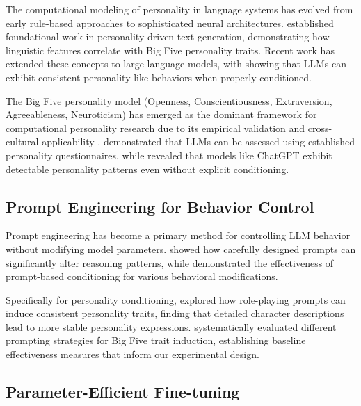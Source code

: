 The computational modeling of personality in language systems has evolved from early rule-based approaches to sophisticated neural architectures. \citet{mairesse-walker-2007-personage} established foundational work in personality-driven text generation, demonstrating how linguistic features correlate with Big Five personality traits. Recent work has extended these concepts to large language models, with \citet{jiang-etal-2023-personallm} showing that LLMs can exhibit consistent personality-like behaviors when properly conditioned.

The Big Five personality model (Openness, Conscientiousness, Extraversion, Agreeableness, Neuroticism) has emerged as the dominant framework for computational personality research due to its empirical validation and cross-cultural applicability \citep{costa-mccrae-1992-big5}. \citet{karra-etal-2022-ai-personality} demonstrated that LLMs can be assessed using established personality questionnaires, while \citet{huang-etal-2023-chatgpt-personality} revealed that models like ChatGPT exhibit detectable personality patterns even without explicit conditioning.

\subsection{Prompt Engineering for Behavior Control}

Prompt engineering has become a primary method for controlling LLM behavior without modifying model parameters. \citet{wei-etal-2022-chain-of-thought} showed how carefully designed prompts can significantly alter reasoning patterns, while \citet{liu-etal-2023-pre-train-prompt-tune} demonstrated the effectiveness of prompt-based conditioning for various behavioral modifications.

Specifically for personality conditioning, \citet{wang-etal-2023-roleplay-prompting} explored how role-playing prompts can induce consistent personality traits, finding that detailed character descriptions lead to more stable personality expressions. \citet{li-etal-2023-personality-prompting} systematically evaluated different prompting strategies for Big Five trait induction, establishing baseline effectiveness measures that inform our experimental design.

\subsection{Parameter-Efficient Fine-tuning}

